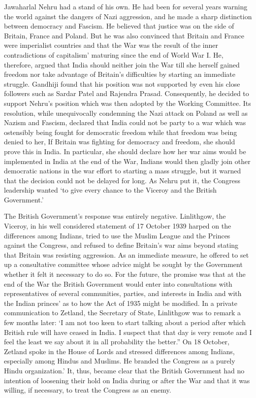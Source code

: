 Jawaharlal Nehru had a stand of his own. He had been for several years warning the world against the dangers of Nazi aggression, and he made a sharp distinction between democracy and Fascism. He believed that justice was on the side of Britain, France and Poland. But he was also convinced that Britain and France were imperialist countries and that the War was the result of the inner contradictions of capitalism’ maturing since the end of World War I. He, therefore, argued that India should neither join the War till she herself gained freedom nor take advantage of Britain’s difficulties by starting an immediate struggle. Gandhiji found that his position was not supported by even his close followers such as Sardar Patel and Rajendra Prasad. Consequently, he decided to support Nehru’s position which was then adopted by the Working Committee. Its resolution, while unequivocally condemning the Nazi attack on Poland as well as Nazism and Fascism, declared that India could not be party to a war which was ostensibly being fought for democratic freedom while that freedom was being denied to her, If Britain was fighting for democracy and freedom, she should prove this in India. In particular, she should declare how her war aims would be implemented in India at the end of the War, Indians would then gladly join other democratic nations in the war effort to starting a mass struggle, but it warned that the decision could not be delayed for long. As Nehru put it, the Congress leadership wanted ‘to give every chance to the Viceroy and the British Government.’ 

The British Government’s response was entirely negative. Linlithgow, the Viceroy, in his well considered statement of 17 October 1939 harped on the differences among Indians, tried to use the Muslim League and the Princes against the Congress, and refused to define Britain’s war aims beyond stating that Britain was resisting aggression. As an immediate measure, he offered to set up a consultative committee whose advice might be sought by the Government whether it felt it necessary to do so. For the future, the promise was that at the end of the War the British Government would enter into consultations with representatives of several communities, parties, and interests in India and with the Indian princes’ as to how the Act of 1935 might be modified. In a private communication to Zetland, the Secretary of State, Linlithgow was to remark a few months later: ‘I am not too keen to start talking about a period after which British rule will have ceased in India. I suspect that that day is very remote and I feel the least we say about it in all probability the better.” On 18 October, Zetland spoke in the House of Lords and stressed differences among Indians, especially among Hindus and Muslims. He branded the Congress as a purely Hindu organization.’ It, thus, became clear that the British Government had no intention of loosening their hold on India during or after the War and that it was willing, if necessary, to treat the Congress as an enemy. 

